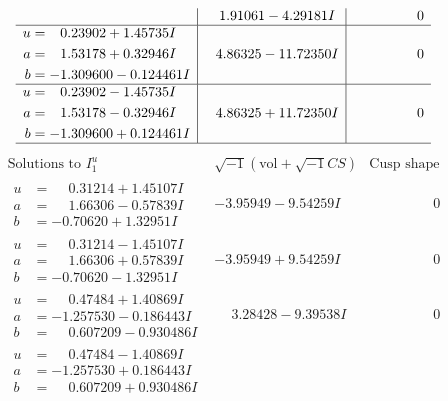 \documentclass[1p]{elsarticle_modified}
\theoremstyle{definition}
\newcommand{\I}{\sqrt{-1}}
\begin{document}
$$\begin{array}{c|c|c}
 & \phantom{-}1.91061 - 4.29181 I & \phantom{-0.000000 } 0 \\ \hline\begin{aligned}
u &= \phantom{-}0.23902 + 1.45735 I \\
a &= \phantom{-}1.53178 + 0.32946 I \\
b &= -1.309600 - 0.124461 I\end{aligned}
 & \phantom{-}4.86325 - 11.72350 I & \phantom{-0.000000 } 0 \\ \hline\begin{aligned}
u &= \phantom{-}0.23902 - 1.45735 I \\
a &= \phantom{-}1.53178 - 0.32946 I \\
b &= -1.309600 + 0.124461 I\end{aligned}
 & \phantom{-}4.86325 + 11.72350 I & \phantom{-0.000000 } 0\\
 \hline 
 \end{array}$$\newpage$$\begin{array}{c|c|c}  
\text{Solutions to }I^u_{1}& \I (\text{vol} + \sqrt{-1}CS) & \text{Cusp shape}\\
 \hline 
\begin{aligned}
u &= \phantom{-}0.31214 + 1.45107 I \\
a &= \phantom{-}1.66306 - 0.57839 I \\
b &= -0.70620 + 1.32951 I\end{aligned}
 & -3.95949 - 9.54259 I & \phantom{-0.000000 } 0 \\ \hline\begin{aligned}
u &= \phantom{-}0.31214 - 1.45107 I \\
a &= \phantom{-}1.66306 + 0.57839 I \\
b &= -0.70620 - 1.32951 I\end{aligned}
 & -3.95949 + 9.54259 I & \phantom{-0.000000 } 0 \\ \hline\begin{aligned}
u &= \phantom{-}0.47484 + 1.40869 I \\
a &= -1.257530 - 0.186443 I \\
b &= \phantom{-}0.607209 - 0.930486 I\end{aligned}
 & \phantom{-}3.28428 - 9.39538 I & \phantom{-0.000000 } 0 \\ \hline\begin{aligned}
u &= \phantom{-}0.47484 - 1.40869 I \\
a &= -1.257530 + 0.186443 I \\
b &= \phantom{-}0.607209 + 0.930486 I\end{aligned}

\end{array}$$
\end{document}
